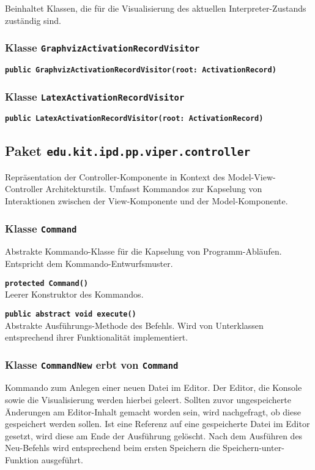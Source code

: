 \documentclass[parskip=full,11pt,twoside]{scrartcl}
\begin{document}
Beinhaltet Klassen, die für die Visualisierung des aktuellen Interpreter-Zustands zuständig sind.

\subsubsection{Klasse \texttt{GraphvizActivationRecordVisitor}}

\textbf{\texttt{public GraphvizActivationRecordVisitor(root: ActivationRecord)}}\\

\subsubsection{Klasse \texttt{LatexActivationRecordVisitor}}

\textbf{\texttt{public LatexActivationRecordVisitor(root: ActivationRecord)}}\\

\subsection{Paket \texttt{edu.kit.ipd.pp.viper.controller}}

Repräsentation der Controller-Komponente in Kontext des Model-View-Controller Architekturstils. Umfasst Kommandos zur Kapselung von Interaktionen zwischen der View-Komponente und der Model-Komponente.

\subsubsection{Klasse \texttt{Command}}
Abstrakte Kommando-Klasse für die Kapselung von Programm-Abläufen. Entspricht dem Kommando-Entwurfsmuster.

\textbf{\texttt{protected Command()}}\\
Leerer Konstruktor des Kommandos.

\textbf{\texttt{public abstract void execute()}}\\
Abstrakte Ausführungs-Methode des Befehls. Wird von Unterklassen entsprechend ihrer Funktionalität implementiert.

\subsubsection{Klasse \texttt{CommandNew} erbt von \texttt{Command}}
Kommando zum Anlegen einer neuen Datei im Editor. Der Editor, die Konsole sowie die Visualisierung werden hierbei geleert. Sollten zuvor ungespeicherte Änderungen am Editor-Inhalt gemacht worden sein, wird nachgefragt, ob diese gespeichert werden sollen. Ist eine Referenz auf eine gespeicherte Datei im Editor gesetzt, wird diese am Ende der Ausführung gelöscht. Nach dem Ausführen des Neu-Befehls wird entsprechend beim ersten Speichern die Speichern-unter-Funktion ausgeführt.
\end{document}
